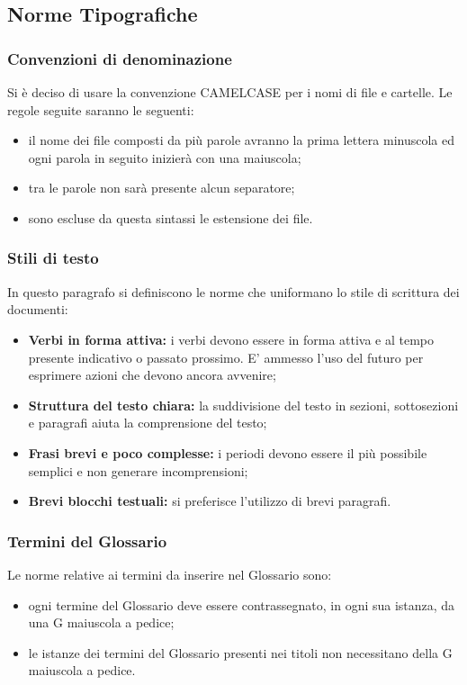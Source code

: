 \subsection{Norme Tipografiche}
\subsubsection{Convenzioni di denominazione}
Si è deciso di usare la convenzione CAMELCASE per i nomi di file e cartelle. Le regole seguite saranno le seguenti:
\begin{itemize}
\item il nome dei file composti da più parole avranno la prima lettera minuscola ed ogni parola in seguito inizierà con una maiuscola; 
	\item tra le parole non sarà presente alcun separatore; 
		\item sono escluse da questa sintassi le estensione dei file. 
\end{itemize}
\subsubsection{Stili di testo}
In questo paragrafo si definiscono le norme che uniformano lo stile di scrittura dei documenti:
\begin{itemize}
\item \textbf{Verbi in forma attiva:} i verbi devono essere in forma attiva e al tempo presente indicativo o passato prossimo. E' ammesso l'uso del futuro per esprimere azioni che devono ancora avvenire;
	\item \textbf{Struttura del testo chiara:} la suddivisione del testo in sezioni, sottosezioni e paragrafi aiuta la comprensione del testo;
		\item \textbf{Frasi brevi e poco complesse:} i periodi devono essere il più possibile semplici e non generare incomprensioni;
			\item \textbf{Brevi blocchi testuali:} si preferisce l'utilizzo di brevi paragrafi.
\end{itemize}
\subsubsection{Termini del Glossario}
Le norme relative ai termini da inserire nel Glossario sono: 
\begin{itemize}
\item ogni termine del Glossario deve essere contrassegnato, in ogni sua istanza, da una G maiuscola a pedice; 
	\item le istanze dei termini del Glossario presenti nei titoli non necessitano della G maiuscola a pedice. 
\end{itemize}
